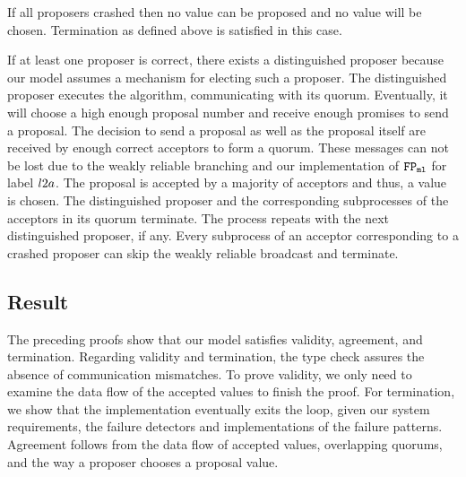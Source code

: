 If all proposers crashed then no value can be proposed and no value will be chosen.
Termination as defined above is satisfied in this case.

If at least one proposer is correct, there exists a distinguished proposer because our model assumes a mechanism for electing such a proposer.
The distinguished proposer executes the algorithm, communicating with its quorum.
Eventually, it will choose a high enough proposal number and receive enough promises to send a proposal.
The decision to send a proposal as well as the proposal itself are received by enough correct acceptors to form a quorum.
These messages can not be lost due to the weakly reliable branching and our implementation of $\mathtt{FP_{ml}}$ for label $l2a$.
The proposal is accepted by a majority of acceptors and thus, a value is chosen.
The distinguished proposer and the corresponding subprocesses of the acceptors in its quorum terminate.
The process repeats with the next distinguished proposer, if any.
Every subprocess of an acceptor corresponding to a crashed proposer can skip the weakly reliable broadcast and terminate.

\subsection{Result}
The preceding proofs show that our model satisfies validity, agreement, and termination.
Regarding validity and termination, the type check assures the absence of communication mismatches.
To prove validity, we only need to examine the data flow of the accepted values to finish the proof.
For termination, we show that the implementation eventually exits the loop, given our system requirements, \ie the failure detectors and implementations of the failure patterns.
Agreement follows from the data flow of accepted values, overlapping quorums, and the way a proposer chooses a proposal value.
